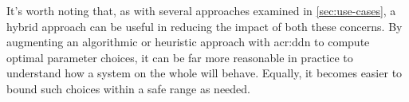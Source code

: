 
It's worth noting that, as with several approaches examined in \cref{sec:use-cases}, a hybrid approach can be useful in reducing the impact of both these concerns.
By augmenting an algorithmic or heuristic approach with \gls{acr:ddn} to compute optimal parameter choices, it can be far more reasonable in practice to understand how a system on the whole will behave.
Equally, it becomes easier to bound such choices within a safe range as needed.

%
%
%
